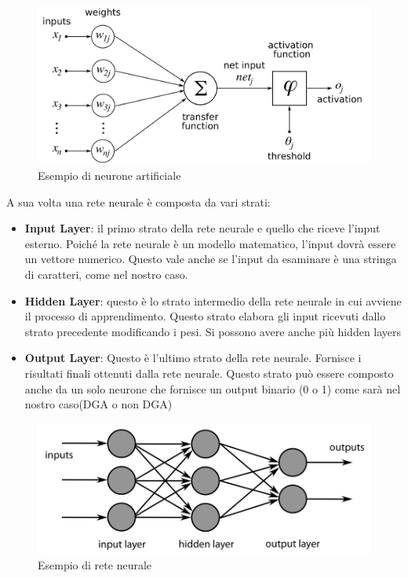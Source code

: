 \documentclass[12pt,a4paper,openright,twoside]{book}
\begin{document}
\begin{figure}[H]
    \centering
    \includegraphics[width=.8\linewidth]{figures/ArtificialNeuronModel.png}
    \caption{Esempio di neurone artificiale \cite{wiki:xxx}}
    \label{fig:AN}
\end{figure}

A sua volta una rete neurale è composta da vari strati:
\begin{itemize}
    \item \textbf{Input Layer}: il primo strato della rete neurale
    e quello che riceve l'input esterno. Poiché la rete neurale
    è un modello matematico, l'input dovrà essere
    un vettore numerico. Questo vale anche se l'input da esaminare
    è una stringa di caratteri, come nel nostro caso.
    \item \textbf{Hidden Layer}: questo è lo strato intermedio della rete neurale in cui avviene
    il processo di apprendimento.
    Questo strato elabora gli input ricevuti dallo strato precedente
    modificando i pesi. Si possono avere anche più hidden layers
    \item \textbf{Output Layer}: Questo è l'ultimo strato della rete neurale.
    Fornisce i risultati finali ottenuti dalla rete neurale. Questo strato
    può essere composto anche da un solo neurone che fornisce
    un output binario (0 o 1) come sarà nel nostro caso(DGA o non DGA)
\end{itemize}

\begin{figure}[H]
    \centering
    \includegraphics[width=.8\linewidth]{figures/MultiLayerNeuralNetwork.png}
    \caption{Esempio di rete neurale \cite{wiki:001}}
    \label{fig:ANN}
\end{figure}
\end{document}

